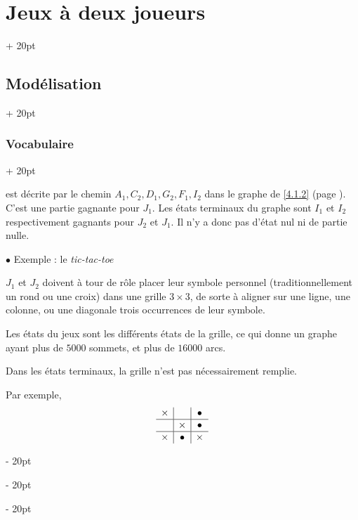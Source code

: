 \documentclass[a4paper, 12pt, twoside]{article}
\newcommand{\ind}[1][20pt]{\advance\leftskip + #1}
\newcommand{\deind}[1][20pt]{\advance\leftskip - #1}
\newenvironment{indt}[2][20pt]{#2 \par \ind[#1]}{\par \deind} %
\begin{document}
\begin{indt}{\section{Jeux à deux joueurs}}
\begin{indt}{\subsection{Modélisation}}
\begin{indt}{\subsubsection{Vocabulaire}}
\begin{center}
                \end{center}

                est décrite par le chemin $A_1, C_2, D_1, G_2, F_1, I_2$ dans le graphe de \ref{4.1.2} (page \pageref{4.1.2}).
                C'est une partie gagnante pour $J_1$. Les états terminaux du graphe sont $I_1$ et $I_2$ respectivement gagnants pour $J_2$ et $J_1$.
                Il n'y a donc pas d'état nul ni de partie nulle.

                \vspace{12pt}
                
                $\bullet$ Exemple : le \emph{tic-tac-toe}

                $J_1$ et $J_2$ doivent à tour de rôle placer leur symbole personnel (traditionnellement un rond ou une croix) dans une grille $3 \times 3$, de sorte à aligner sur une ligne, une colonne, ou une diagonale trois occurrences de leur symbole.

                Les états du jeux sont les différents états de la grille, ce qui donne un graphe ayant plus de $5 000$ sommets, et plus de $16 000$ arcs.

                Dans les états terminaux, la grille n'est pas nécessairement remplie.

                Par exemple,
                \[
                    \begin{array}{c|c|c}
                        \times & & \bullet
                        \\
                        \hline
                               & \times & \bullet
                        \\
                        \hline
                        \times & \bullet & \times
                    \end{array}
                \]


\end{indt}
\end{indt}
\end{indt}
\end{document}
